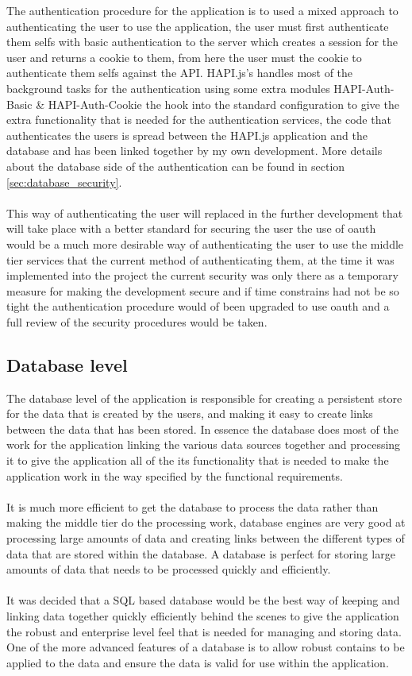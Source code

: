 The authentication procedure for the application is to used a mixed approach to authenticating the user to use the application, the user must first authenticate them selfs with basic authentication to the server which creates a session for the user and returns a cookie to them, from here the user must the cookie to authenticate them selfs against the API. HAPI.js's handles most of the background tasks for the authentication using some extra modules HAPI-Auth-Basic \& HAPI-Auth-Cookie the hook into the standard configuration to give the extra functionality that is needed for the authentication services, the code that authenticates the users is spread between the HAPI.js application and the database and has been linked together by my own development. More details about the database side of the authentication can be found in section \ref{sec:database_security}.\\
\\
This way of authenticating the user will replaced in the further development that will take place with a better standard for securing the user the use of oauth would be a much more desirable way of authenticating the user to use the middle tier services that the current method of authenticating them, at the time it was implemented into the project the current security was only there as a temporary measure for making the development secure and if time constrains had not be so tight the authentication procedure would of been upgraded to use oauth and a full review of the security procedures would be taken.

\subsection{Database level}

The database level of the application is responsible for creating a persistent store for the data that is created by the users, and making it easy to create links between the data that has been stored. In essence the database does most of the work for the application linking the various data sources together and processing it to give the application all of the its functionality that is needed to make the application work in the way specified by the functional requirements.\\
\\
It is much more efficient to get the database to process the data rather than making the middle tier do the processing work, database engines are very good at processing large amounts of data and creating links between the different types of data that are stored within the database. A database is perfect for storing large amounts of data that needs to be processed quickly and efficiently.\\
\\
It was decided that a SQL based database would be the best way of keeping and linking data together quickly efficiently behind the scenes to give the application the robust and enterprise level feel that is needed for managing and storing data. One of the more advanced features of a database is to allow robust contains to be applied to the data and ensure the data is valid for use within the application.

